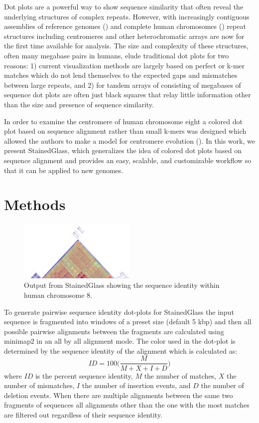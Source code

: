 \documentclass{bioinfo}
\begin{document}
Dot plots are a powerful way to show sequence similarity that often reveal the
underlying structures of complex repeats. However, with increasingly
contiguous assemblies of reference genomes (\citealp{Rhie2021-zg}) and complete human chromosomes (\citealp{Miga2020-pj,Logsdon2021-zr,Nurk2021-wb})
repeat structures including centromeres and other
heterochromatic arrays are now for the first time available for analysis. The
size and complexity of these structures, often many megabase pairs in humans,
elude traditional dot plots for two reasons: 1) current visualization methods
are largely based on perfect or k-mer matches which do not lend themselves to
the expected gaps and mismatches between large repeats, and 2) for tandem arrays of consisting of megabases of sequence dot plots are often just black squares
that relay little information other than the size and presence of sequence
similarity. 

In order to examine the centromere of human chromosome eight a colored dot plot
based on sequence alignment rather than small k-mers was designed which allowed
the authors to make a model for centromere evolution (\citealp{Logsdon2021-zr}). In this work, we present
StainedGlass, which generalizes the idea of colored dot plots based on sequence
alignment and provides an easy, scalable, and customizable workflow so that it
can be applied to new genomes. 

\section{Methods} 
\begin{figure}[!tpb]%
\centerline{\includegraphics[width=0.5\textwidth,keepaspectratio]{../images/chr8.png}}
\caption{Output from StainedGlass showing the sequence identity within human chromosome 8.}\label{fig:01}
\end{figure}


To generate pairwise sequence identity dot-plots for
StainedGlass the input sequence is fragmented into windows of a preset size
(default 5 kbp) and then all possible pairwise alignments between the fragments
are calculated using minimap2 \cite{Li2018-is} in an all by all alignment mode. The color used in
the dot-plot is determined by the sequence identity of the alignment which is
calculated as: $$ ID = 100 \biggl( \frac{M}{M+X+I+D} \biggr) $$ where $ID$ is
the percent sequence identity, $M$ the number of matches, $X$ the number of
mismatches, $I$ the number of insertion events, and $D$ the number of deletion
events. When there are multiple alignments between the same two fragments of
sequences all alignments other than the one with the most matches are filtered
out regardless of their sequence identity.
\end{document}
